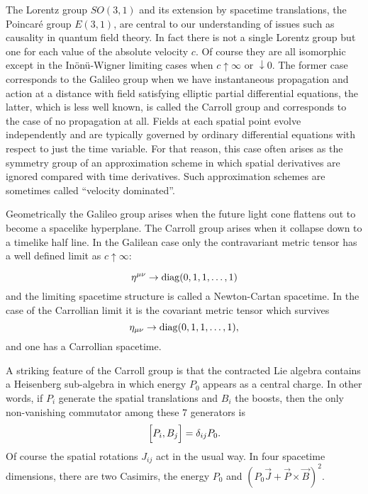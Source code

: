 \documentclass[a4paper,12pt]{article}
\begin{document}
The Lorentz group $SO(3,1)$ and its extension by spacetime
translations, the  Poincar\'e group $E(3,1)$, are central to our
understanding of  issues such as  causality  in quantum field
theory. In fact there is not a single Lorentz group but one for
each value of the absolute velocity $c$. Of course they are all
isomorphic except in the In\"on\"u-Wigner limiting cases when 
$c \uparrow \infty$ or $\downarrow 0$. The former case corresponds to
the Galileo group when we have instantaneous propagation and
action at a distance with field satisfying elliptic partial
differential equations, the latter, which is less well known, is
called the Carroll group \cite{Leblond, Sen} and corresponds to
the case of no propagation at all. Fields at each spatial point
evolve independently and are typically governed by ordinary
differential equations with respect to just the time variable. For
that reason, this case often arises as the symmetry group of an
approximation scheme in which spatial derivatives are ignored
compared with time derivatives. Such approximation schemes are
sometimes called ``velocity dominated''.

Geometrically the Galileo group arises when the future light cone
flattens out to become a spacelike hyperplane. The Carroll group
arises when it collapse down to a timelike half line. In the
Galilean case only the contravariant metric tensor has a well
defined limit as $c \uparrow \infty$:

\begin{equation} 
\eta ^{\mu \nu} \rightarrow {\rm diag} (0,1,1,\dots ,1) 
\end{equation}
and the limiting spacetime structure is called a Newton-Cartan
spacetime. In the case of the Carrollian limit it is the covariant
metric tensor which survives
\begin{equation} 
\eta_{\mu \nu } \rightarrow {\rm diag} (0,1,1,\dots, 1),
\end{equation}
and one has a Carrollian spacetime.

A striking feature of the
Carroll group is that the contracted Lie algebra contains a
Heisenberg sub-algebra in which energy $P_0$ appears as a central
charge. In other words, if $P_i$ generate the spatial translations
and $B_i$ the boosts, then the only non-vanishing commutator among
these  7 generators is
\begin{equation} 
\Bigl [ P_i, B_j\Bigr ]= \delta_{ij} P_0.  
\end{equation}
Of course the spatial rotations $J_{ij}$ act in the usual way. In
four spacetime dimensions,  there are two Casimirs, the energy
$P_0$ and $(P_0  {\vec  J }+  {\vec  P} \times {\vec B} ) ^2$.
\end{document}
